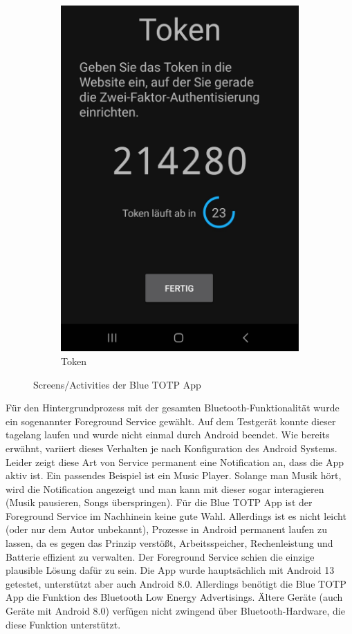 \begin{figure}[h]
\begin{subfigure}{.23\textwidth}
        \includegraphics[width=.95\linewidth]{figures/impl/screenshot_app_token.jpg}
        \caption{Token}
        \label{fig: blue totp app screenshot token}
    \end{subfigure}
    \caption[Screens der Blue TOTP App]{Screens/Activities der Blue TOTP App}
    \label{fig: blue totp app screenshots}
\end{figure}

Für den Hintergrundprozess mit der gesamten Bluetooth-Funktionalität wurde ein 
sogenannter Foreground Service gewählt. Auf dem Testgerät konnte dieser tagelang 
laufen und wurde nicht einmal durch Android beendet. Wie bereits erwähnt, variiert 
dieses Verhalten je nach Konfiguration des Android Systems. Leider zeigt diese Art 
von Service permanent eine Notification an, dass die App aktiv ist. Ein passendes 
Beispiel ist ein Music Player. Solange man Musik hört, wird die Notification 
angezeigt und man kann mit dieser sogar interagieren (Musik pausieren, Songs 
überspringen). Für die Blue TOTP App ist der Foreground Service im Nachhinein keine 
gute Wahl. Allerdings ist es nicht leicht (oder nur dem Autor unbekannt), Prozesse 
in Android permanent laufen zu lassen, da es gegen das Prinzip verstößt, 
Arbeitsspeicher, Rechenleistung und Batterie effizient zu verwalten. Der Foreground 
Service schien die einzige plausible Lösung dafür zu sein. Die App wurde 
hauptsächlich mit Android 13 getestet, unterstützt aber auch Android 8.0. 
Allerdings benötigt die Blue TOTP App die Funktion des Bluetooth Low Energy 
Advertisings. Ältere Geräte (auch Geräte mit Android 8.0) verfügen nicht zwingend 
über Bluetooth-Hardware, die diese Funktion unterstützt.